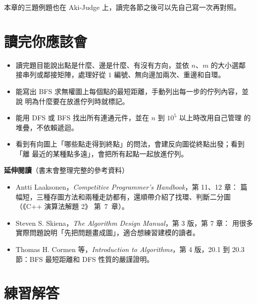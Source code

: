 本章的三題例題也在 Aki-Judge 上，讀完各節之後可以先自己寫一次再對照。

\section{讀完你應該會}
\label{sec:ch11-checklist}

\begin{itemize}
\item 讀完題目能說出點是什麼、邊是什麼、有沒有方向，並依 $n$、$m$ 的大小選鄰
接串列或鄰接矩陣，處理好從 $1$ 編號、無向邊加兩次、重邊和自環。
\item 能寫出 BFS 求無權圖上每個點的最短距離，手動列出每一步的佇列內容，並說
明為什麼要在放進佇列時就標記。
\item 能用 DFS 或 BFS 找出所有連通元件，並在 $n$ 到 $10^5$ 以上時改用自己管理
的堆疊，不依賴遞迴。
\item 看到有向圖上「哪些點走得到終點」的問法，會建反向圖從終點出發；看到「離
最近的某種點多遠」，會把所有起點一起放進佇列。
\end{itemize}

\textbf{延伸閱讀}（書末會整理完整的參考資料）

\begin{itemize}
\item Antti Laaksonen，\textit{Competitive Programmer's Handbook}，第 11、12 章：
篇幅短，三種存圖方法和兩種走訪都有，還順帶介紹了找環、判斷二分圖（《C++ 演算法解題 2》
第~7~章）。
\item Steven S. Skiena，\textit{The Algorithm Design Manual}，第 3 版，第 7 章：
用很多實際問題說明「先把問題畫成圖」，適合想練習建模的讀者。
\item Thomas H. Cormen 等，\textit{Introduction to Algorithms}，第 4 版，20.1
到 20.3 節：BFS 最短距離和 DFS 性質的嚴謹證明。
\end{itemize}

\section*{練習解答}

